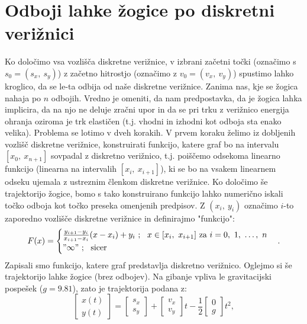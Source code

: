 \documentclass{article}
\begin{document}
\section{Odboji lahke žogice po diskretni verižnici}
Ko določimo vsa vozlišča diskretne verižnice, v izbrani začetni točki (označimo s $s_0 = (s_x,~s_y)$) z začetno hitrostjo (označimo z $v_0 = (v_x,~v_y)$) spustimo lahko kroglico, da se le-ta odbija od naše diskretne verižnice. 
Zanima nas, kje se žogica nahaja po $n$ odbojih.
\newline
Vredno je omeniti, da nam predpostavka, da je žogica lahka implicira, da na njo ne deluje zračni upor in da se pri trku z verižnico energija ohranja oziroma je trk elastičen (t.j. vhodni in izhodni kot odboja sta enako velika).
\newline
Problema se lotimo v dveh korakih. V prvem koraku želimo iz dobljenih vozlišč diskretne verižnice, konstruirati funkcijo, katere graf bo na intervalu $[x_0,~x_{n+1}]$ sovpadal z diskretno verižnico, t.j. poiščemo odsekoma linearno funkcijo (linearna na intervalih $[x_i,~x_{i+1}]$), ki se bo na vsakem linearnem odseku ujemala z ustreznim členkom diskretne verižnice. 
Ko določimo še trajektorijo žogice, bomo s tako konstruirano funkcijo lahko numerično iskali točko odboja kot točko preseka omenjenih predpisov. 
\newline
Z $(x_i, ~y_i)$ označimo $i$-to zaporedno vozlišče diskretne verižnice in definirajmo "funkcijo":
$$
    F(x) = \begin{cases}
        \frac{y_{i+1} - y_i}{x_{i+1} - x_i}(x - x_i) + y_i~;~~ x \in [x_i,~ x_{i+1}]~\text{za}~ i=0,~1,~\dots,~n\\
        "\infty"~;~~\text{sicer}
    \end{cases}.
$$
Zapisali smo funkcijo, katere graf predstavlja diskretno verižnico. Oglejmo si še trajektorijo lahke žogice (brez odbojev). 
Na gibanje vpliva le gravitacijski pospešek ($g = 9.81$), zato je trajektorija podana z:
$$
\begin{bmatrix}
    x(t) \\
    y(t)
\end{bmatrix} =
\begin{bmatrix}
    s_x \\
    s_y
\end{bmatrix} + 
\begin{bmatrix}
    v_x \\
    v_y
\end{bmatrix} t - \frac{1}{2}
\begin{bmatrix}
    0\\
    g
\end{bmatrix} t^2,
$$
\end{document}

